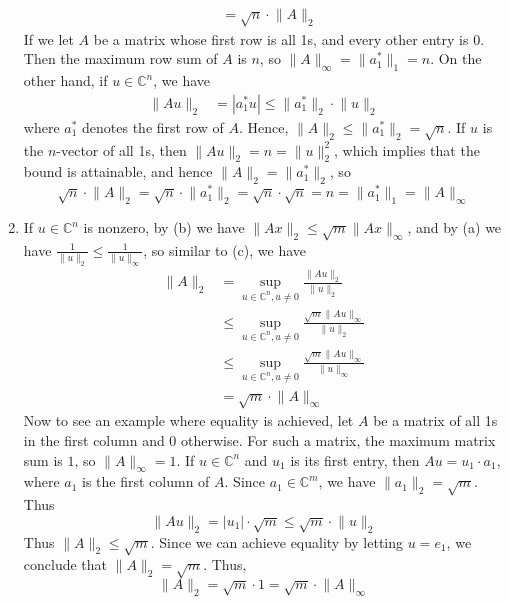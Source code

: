 \documentclass[12pt]{article}
\newenvironment{sol}[1][Solution]{\begin{trivlist}
		\item[\hskip \labelsep {\bfseries #1:}]}{\end{trivlist}}
\begin{document}
\begin{sol}
\begin{enumerate}[label=(\alph*)]
\begin{align*}
			&=\sqrt{n}\cdot \lVert A\rVert_2
		\end{align*}
		If we let $A$ be a matrix whose first row is all 1s, and every other entry is 0. Then the maximum
		row sum of $A$ is $n$, so $\lVert A\rVert_{\infty}=\lVert a_1^*\rVert_1=n$. On the other hand, if
		$u\in\mathbb{C}^n$, we have
		\begin{align*}
			\lVert Au\rVert_2&= |a_1^*u|\leq \lVert a_1^*\rVert_2\cdot \lVert u\rVert_2
		\end{align*}
		where $a_1^*$ denotes the first row of $A$. Hence, $\lVert A\rVert_2\leq \lVert a_1^*\rVert_2=\sqrt{n}$.
		If $u$ is the $n$-vector of all 1s, then $\lVert Au\rVert_2 = n = \lVert u\rVert_2^2$, which implies
		that the bound is attainable, and hence $\lVert A\rVert_2 = \lVert a_1^*\rVert_2$, so
		\[
		\sqrt{n}\cdot \lVert A\rVert_2 = \sqrt{n}\cdot \lVert a_1^*\rVert_2 = \sqrt{n}\cdot \sqrt{n}=n
		=\lVert a_1^*\rVert_1=\lVert A\rVert_\infty
		\]
		
		\item If $u\in \mathbb{C}^n$ is nonzero, by (b) we have $\lVert Ax\rVert_{2}\leq\sqrt{m}\lVert Ax\rVert_{\infty}$,
		and by (a) we have $\frac{1}{\lVert u\rVert_2}\leq \frac{1}{\lVert u\rVert_{\infty}}$, so similar
		to (c), we have
		\begin{align*}
			\lVert A\rVert_2&= \sup_{u\in\mathbb{C}^n,u\neq 0}\frac{\lVert Au\rVert_2}{\lVert u\rVert_2}\\
			&\leq \sup_{u\in\mathbb{C}^n,u\neq 0}\frac{\sqrt{m}\lVert Au\rVert_\infty}{\lVert u\rVert_2}\\
			&\leq \sup_{u\in\mathbb{C}^n,u\neq 0}\frac{\sqrt{m} \lVert Au\rVert_\infty}{\lVert u\rVert_\infty}\\
			&=\sqrt{m}\cdot \lVert A\rVert_{\infty}
		\end{align*}
		Now to see an example where equality is achieved, let $A$ be a matrix of all 1s in the first column
		and 0 otherwise. For such a matrix, the maximum matrix sum is $1$, so $\lVert A\rVert_{\infty}=1$.
		If $u\in\mathbb{C}^n$ and $u_1$ is its first entry, then $Au = u_1\cdot a_1$, where $a_1$
		is the first column of $A$. Since $a_1\in \mathbb{C}^m$, we have $\lVert a_1\rVert_2 = \sqrt{m}$. Thus
		\[
		\lVert Au\rVert_2 = |u_1|\cdot \sqrt{m}\leq \sqrt{m}\cdot \lVert u\rVert_2
		\]
		Thus $\lVert A\rVert_2\leq \sqrt{m}$. Since we can achieve equality by letting $u=e_1$, we
		conclude that $\lVert A\rVert_2 = \sqrt{m}$. Thus,
		\[
		\lVert A\rVert_2 = \sqrt{m} \cdot 1 = \sqrt{m}\cdot \lVert A\rVert_{\infty}
		\]
	\end{enumerate}
\end{sol}
\end{document}
